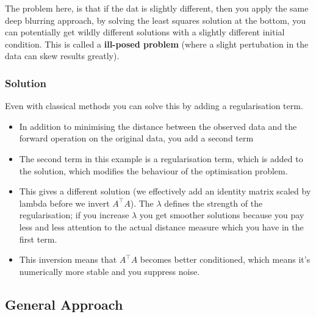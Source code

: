 \documentclass[11pt]{article}
\begin{document}
The problem here, is that if the dat is slightly different, then you apply the same deep blurring approach, by solving the least squares solution at the bottom, you can potentially get wildly different solutions with a slightly different initial condition. This is called a \textbf{ill-posed problem} (where a slight pertubation in the data can skew results greatly).

\subsubsection{Solution}

\begin{minipage}[l]{.5\linewidth}
    \begin{figure}[H]
        \centering
    \end{figure}    
\end{minipage}\hfill
\begin{minipage}[r]{.48\linewidth}
    Even with classical methods you can solve this by adding a regularisation term.
    \begin{itemize}
        \item In addition to minimising the distance between the observed data and the forward operation on the original data, you add a second term
        \item The second term in this example is a regularisation term, which is added to the solution, which modifies the behaviour of the optimisation problem. 
    \end{itemize}
\end{minipage}

\begin{itemize}
    \item This gives a different solution (we effectively add an identity matrix scaled by lambda before we invert $A^\top A$). The $\lambda$ defines the strength of the regularisation; if you increase $\lambda$ you get smoother solutions because you pay less and less attention to the actual distance measure which you have in the first term.
    \item This inversion means that $A^\top A$ becomes better conditioned, which means it's numerically more stable and you suppress noise.
\end{itemize}

\subsection{General Approach}
\end{document}
